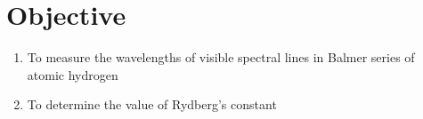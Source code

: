 \section{Objective}

\begin{enumerate}
    \item To measure the wavelengths of visible spectral lines in Balmer series of atomic hydrogen
    \item To determine the value of Rydberg's constant
\end{enumerate}